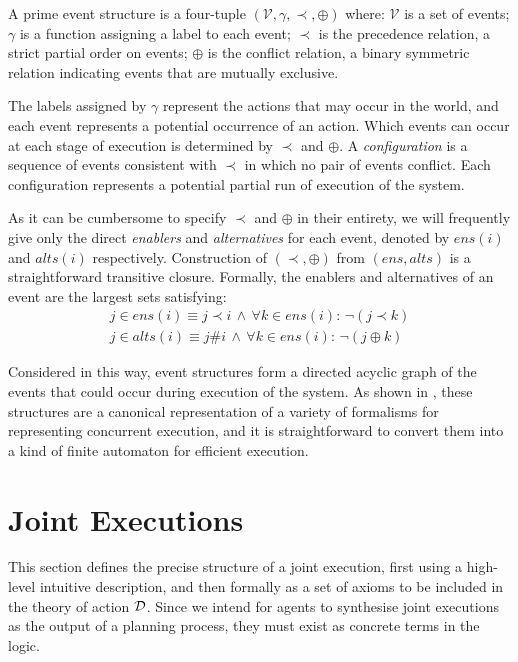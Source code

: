 \begin{defnL}
 A prime event structure is a
four-tuple $(\mathcal{V},\gamma,\prec,\oplus)$ where: $\mathcal{V}$
is a set of events; $\gamma$ is a function assigning a label to each
event; $\prec$ is the precedence relation, a strict partial order
on events; $\oplus$ is the conflict relation, a binary symmetric
relation indicating events that are mutually exclusive. 
\end{defnL}
The labels assigned by $\gamma$ represent the actions that may occur
in the world, and each event represents a potential occurrence of
an action. Which events can occur at each stage of execution is determined
by $\prec$ and $\oplus$. A \emph{configuration} is a sequence of
events consistent with $\prec$ in which no pair of events conflict.
Each configuration represents a potential partial run of execution
of the system.

As it can be cumbersome to specify $\prec$ and $\oplus$ in their
entirety, we will frequently give only the direct \emph{enablers}
and \emph{alternatives} for each event, denoted by $ens(i)$ and $alts(i)$
respectively. Construction of $(\prec,\oplus)$ from $(ens,alts)$
is a straightforward transitive closure. Formally, the enablers and
alternatives of an event are the largest sets satisfying:\begin{gather*}
j\in ens(i)\equiv j\prec i\,\wedge\,\forall k\in ens(i):\,\neg(j\prec k)\\
j\in alts(i)\equiv j\#i\,\wedge\,\forall k\in ens(i):\,\neg(j\oplus k)\end{gather*}


Considered in this way, event structures form a directed acyclic graph
of the events that could occur during execution of the system. As
shown in \citep{pratt91modeling_conc_with_geom}, these structures
are a canonical representation of a variety of formalisms for representing
concurrent execution, and it is straightforward to convert them into
a kind of finite automaton for efficient execution.


\section{Joint Executions\label{sec:JointExec:JEs}}

This section defines the precise structure of a joint execution, first
using a high-level intuitive description, and then formally as a set
of axioms to be included in the theory of action $\mathcal{D}$. Since we
intend for agents to synthesise joint executions as the output of
a planning process, they must exist as concrete terms in the logic.


